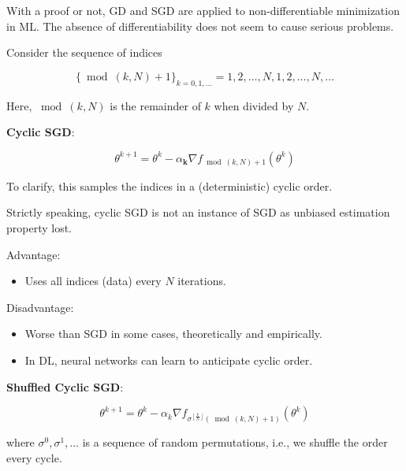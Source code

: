 With a proof or not, GD and SGD are applied to non-differentiable minimization in ML. The absence of differentiability does not seem to cause serious problems.

\begin{definition}
    Consider the sequence of indices

    $$
    \{\bmod (k, N)+1\}_{k=0,1, \ldots}=1,2, \ldots, N, 1,2, \ldots, N, \ldots
    $$

    Here, $\bmod (k, N)$ is the remainder of $k$ when divided by $N$.

    \textbf{Cyclic SGD}:

    $$
    \theta^{k+1}=\theta^{k}-\alpha_{\mathbf{k}} \nabla f_{\bmod (k, N)+1}\left(\theta^{k}\right)
    $$

    To clarify, this samples the indices in a (deterministic) cyclic order.
\end{definition}

\begin{concept}
    Strictly speaking, cyclic SGD is not an instance of SGD as unbiased estimation property lost.

    Advantage:

    \begin{itemize}
        \item Uses all indices (data) every $N$ iterations.
    \end{itemize}

    Disadvantage:

    \begin{itemize}
        \item Worse than SGD in some cases, theoretically and empirically.
        \item In DL, neural networks can learn to anticipate cyclic order.
    \end{itemize}
\end{concept}

\begin{definition}
    \textbf{Shuffled Cyclic SGD}:

    $$
    \theta^{k+1}=\theta^{k}-\alpha_{k} \nabla f_{\sigma^{\left \lfloor \frac{k}{N} \right \rfloor} (\bmod (k, N)+1)}\left(\theta^{k}\right)
    $$

    where $\sigma^{0}, \sigma^{1}, \ldots$ is a sequence of random permutations, i.e., we shuffle the order every cycle.
\end{definition}

